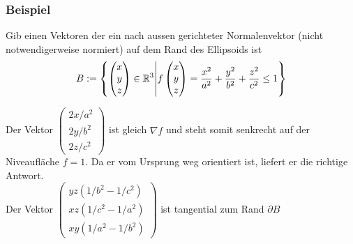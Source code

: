 \subsubsection*{Beispiel}
Gib einen Vektoren der ein nach aussen gerichteter Normalenvektor
(nicht notwendigerweise normiert) auf dem Rand des Ellipsoids ist \[
B := 
\left\{ 
	\begin{pmatrix} x\\ y\\ z \end{pmatrix} \in \mathbb{R}^3  
	\middle\vert
	f\begin{pmatrix} x\\ y\\ z \end{pmatrix} 
		= \frac{x^2}{a^2} + \frac{y^2}{b^2} + \frac{z^2}{c^2} \leq 1
\right\}
\]

Der Vektor $\begin{pmatrix} 2x/a^2\\ 2y/b^2\\ 2z/c^2 \end{pmatrix}$ ist gleich $\nabla f$ und steht somit 
senkrecht auf der Niveaufläche $f=1$. Da er vom Ursprung weg orientiert ist, liefert er die richtige Antwort.\\
Der Vektor $\begin{pmatrix} yz(1/b^2-1/c^2)\\ xz(1/c^2-1/a^2)\\ xy(1/a^2-1/b^2) \end{pmatrix}$ ist tangential 
zum Rand $\partial B$

